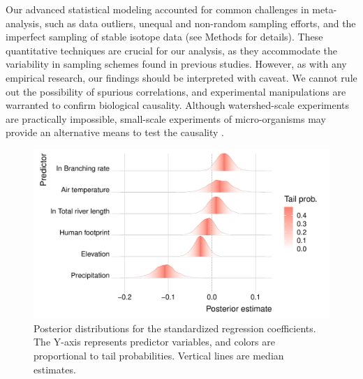 \documentclass[11pt, class=article, crop=false]{standalone}
\begin{document}
Our advanced statistical modeling accounted for common challenges in meta-analysis, such as data outliers, unequal and non-random sampling efforts, and the imperfect sampling of stable isotope data (see Methods for details).
These quantitative techniques are crucial for our analysis, as they accommodate the variability in sampling schemes found in previous studies.
However, as with any empirical research, our findings should be interpreted with caveat.
We cannot rule out the possibility of spurious correlations, and experimental manipulations are warranted to confirm biological causality.
Although watershed-scale experiments are practically impossible, small-scale experiments of micro-organisms may provide an alternative means to test the causality \citep{altermatt_big_2015, green_long_2023}.

\begin{figure}
    \centering
    \includegraphics[width=0.75\linewidth]{data_fmt/fig_emp_ridge.pdf}
    \caption{Posterior distributions for the standardized regression coefficients. The Y-axis represents predictor variables, and colors are proportional to tail probabilities. Vertical lines are median estimates.}
    \label{fig:ridge}
\end{figure}
\end{document}
